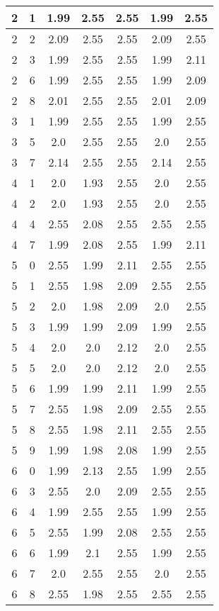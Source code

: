 \begin{longtable}{|c|c||c||c|c||c|c|}
	2 & 1 & 1.99 & 2.55 & 2.55 & 1.99 & 2.55 \\ \hline
	2 & 2 & 2.09 & 2.55 & 2.55 & 2.09 & 2.55 \\ \hline
	2 & 3 & 1.99 & 2.55 & 2.55 & 1.99 & 2.11 \\ \hline
	2 & 6 & 1.99 & 2.55 & 2.55 & 1.99 & 2.09 \\ \hline
	2 & 8 & 2.01 & 2.55 & 2.55 & 2.01 & 2.09 \\ \hline
	3 & 1 & 1.99 & 2.55 & 2.55 & 1.99 & 2.55 \\ \hline
	3 & 5 & 2.0 & 2.55 & 2.55 & 2.0 & 2.55 \\ \hline
	3 & 7 & 2.14 & 2.55 & 2.55 & 2.14 & 2.55 \\ \hline
	4 & 1 & 2.0 & 1.93 & 2.55 & 2.0 & 2.55 \\ \hline
	4 & 2 & 2.0 & 1.93 & 2.55 & 2.0 & 2.55 \\ \hline
	4 & 4 & 2.55 & 2.08 & 2.55 & 2.55 & 2.55 \\ \hline
	4 & 7 & 1.99 & 2.08 & 2.55 & 1.99 & 2.11 \\ \hline
	5 & 0 & 2.55 & 1.99 & 2.11 & 2.55 & 2.55 \\ \hline
	5 & 1 & 2.55 & 1.98 & 2.09 & 2.55 & 2.55 \\ \hline
	5 & 2 & 2.0 & 1.98 & 2.09 & 2.0 & 2.55 \\ \hline
	5 & 3 & 1.99 & 1.99 & 2.09 & 1.99 & 2.55 \\ \hline
	5 & 4 & 2.0 & 2.0 & 2.12 & 2.0 & 2.55 \\ \hline
	5 & 5 & 2.0 & 2.0 & 2.12 & 2.0 & 2.55 \\ \hline
	5 & 6 & 1.99 & 1.99 & 2.11 & 1.99 & 2.55 \\ \hline
	5 & 7 & 2.55 & 1.98 & 2.09 & 2.55 & 2.55 \\ \hline
	5 & 8 & 2.55 & 1.98 & 2.11 & 2.55 & 2.55 \\ \hline
	5 & 9 & 1.99 & 1.98 & 2.08 & 1.99 & 2.55 \\ \hline
	6 & 0 & 1.99 & 2.13 & 2.55 & 1.99 & 2.55 \\ \hline
	6 & 3 & 2.55 & 2.0 & 2.09 & 2.55 & 2.55 \\ \hline
	6 & 4 & 1.99 & 2.55 & 2.55 & 1.99 & 2.55 \\ \hline
	6 & 5 & 2.55 & 1.99 & 2.08 & 2.55 & 2.55 \\ \hline
	6 & 6 & 1.99 & 2.1 & 2.55 & 1.99 & 2.55 \\ \hline
	6 & 7 & 2.0 & 2.55 & 2.55 & 2.0 & 2.55 \\ \hline
	6 & 8 & 2.55 & 1.98 & 2.55 & 2.55 & 2.55 \\ \hline

\end{longtable}
